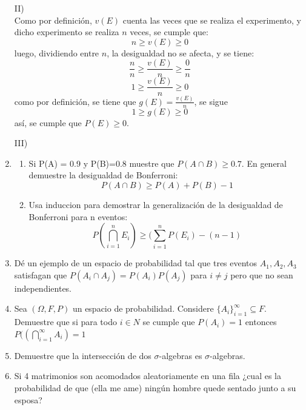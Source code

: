 \documentclass[12pt,a4paper]{report}
\begin{document}
\begin{enumerate}
{	II)\\
		Como por definición, $v(E)$ cuenta las veces que se realiza el experimento,
		y dicho experimento se realiza $n$ veces, se cumple que:
			$$ n \geq v(E) \geq 0$$
		luego, dividiendo entre $n$, la desigualdad no se afecta, y se tiene:
			$$ \frac{n}{n} \geq \frac{v(E)}{n} \geq \frac{0}{n}$$
			$$ 1 \geq \frac{v(E)}{n} \geq 0$$
		como por definición, se tiene que $g(E) = \frac{v(E)}{n}$, se sigue
			$$ 1 \geq g(E) \geq 0$$
		así, se cumple que $P(E) \geq 0$.


	III)\\
		
	}

   \item {
  	\begin{enumerate}[label=\alph*) ]
   \item {
	Si P(A) = 0.9 y P(B)=0.8 muestre que $P(A \cap B) \geq 0.7$. En general demuestre la desigualdad de Bonferroni:\\
	$$P(A \cap B) \geq P(A)+P(B) -1$$
   }

   \item {
 Usa induccion para demostrar la generalización de la desigualdad de Bonferroni para n eventos:\\
 $$P(\bigcap\limits_{i=1}^{n} E_{i}) \geq (\sum_{i=1}^{n} P(E_{i})-(n-1)$$

   }




	\end{enumerate}
	}

  \item{
  Dé un ejemplo de un espacio de probabilidad tal que tres eventos $A_{1},A_{2},A_{3}$ satisfagan que $P(A_{i} \cap A_{j})=P(A_{i})P(A_{j})$ para $i\neq j$ pero que no sean independientes.
  }


  \item{
 Sea $(\Omega, F, P)$ un espacio de probabilidad. Considere $\lbrace A_{i} \rbrace_{i=1}^{\infty} \subseteq F$. Demuestre que si para todo $i \in N$ se cumple que $P(A_{i})=1$ entonces $P((\bigcap\limits_{i=1}^{\infty}A_{i})=1$
  }

  \item{
 Demuestre que la intersección de dos $\sigma$-algebras es $\sigma$-algebras.
  }


  \item{
Si 4 matrimonios son acomodados aleatoriamente en una fila ¿cual es la probabilidad de que (ella me ame) ningún hombre quede sentado junto a su esposa?
  }


\end{enumerate}
\end{document}
